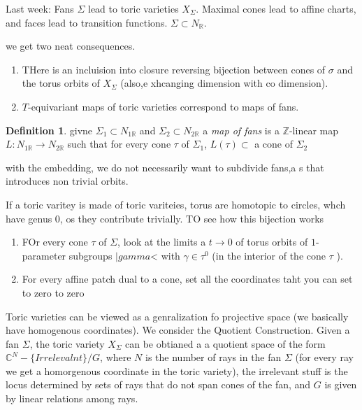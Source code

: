 \documentclass[11pt]{article}
\theoremstyle{definition}
\theoremstyle{plain}%
\theoremstyle{definition}
\newtheorem{protodefinition}{Definition}[section]
\newenvironment{defn}
   {\colorlet{shadecolor}{black!15}\begin{shaded}\begin{protodefinition}}
   {\end{protodefinition}\end{shaded}}
\def\ZZ{{\mathbb Z}}
\def\RR{{\mathbb R}}
\def\CC{{\mathbb C}}
\begin{document}


Last week: Fans $\Sigma$ lead to toric varieties $X_\Sigma$. Maximal cones lead to affine charts, and faces lead to transition functions. $\Sigma \subset N_\RR$. 


we get two neat consequences.
\begin{enumerate}
    \item THere is an incluision into closure reversing bijection between cones of $\sigma$ and the torus orbits of $X_\Sigma$ (also,e xhcanging dimension with co dimension).
    \item $T$-equivariant maps of toric varieties correspond to maps of fans.
\end{enumerate}

\begin{defn}
    givne $\Sigma_1 \subset N_{1\RR}$ and $\Sigma_2 \subset N_{2\RR}$ a \emph{map of fans} is a $\ZZ$-linear map $L: N_{1\RR}\rightarrow N_{2\RR}$ such that for every cone $\tau$ of $\Sigma_1$, $L(\tau) \subset $ a cone of $\Sigma_2$
\end{defn}
with the embedding, we do not necessarily want to subdivide fans,a s that introduces non trivial orbits.

If a toric varitey is made of toric variteies, torus are homotopic to circles, whch have genus 0, os they contribute trivially.
TO see how this bijection works

\begin{enumerate}
    \item FOr every cone $\tau$ of $\Sigma$, look at the limits a $t \rightarrow 0$ of  torus orbits of $1$-parameter subgroups $|gamma$< with $\gamma \in \tau^0$ (in the interior of the cone $\tau$ ).
    \item For every affine patch dual to a cone, set all the coordinates taht you can set to zero to zero
\end{enumerate}



Toric varieties can be viewed as a genralization fo projective space (we basically have homogenous coordinates). We consider the Quotient Construction. Given a fan $\Sigma$, the toric variety $X_\Sigma$ can be obtianed a a quotient space of the form $\CC^{N}- \{Irrelevalnt\} / G$, where $N$ is the number of rays in the fan $\Sigma$ (for every ray we get a homorgenous coordinate in the toric variety), the irrelevant stuff is the locus determined by sets of rays that do not span cones of the fan, and $G$ is given by linear relations among rays.
\end{document}
